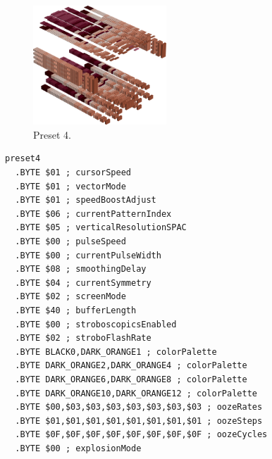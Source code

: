 \begin{minipage}[b]{0.48\linewidth}
\begin{figure}[H]                                                          
  \centering                                                             
  \begin{adjustbox}{width=5cm,center}                                   
  \includegraphics[width=5cm]{src/colorspace_presets/preset4-45.png}%
  \end{adjustbox}                                                        
\caption*{Preset 4.}                                           
\end{figure}                                                               
\end{minipage}
\hspace{0.1cm}
\begin{minipage}[b]{0.48\linewidth}                                       
\begin{lstlisting}[basicstyle=\ttfamily\tiny]
preset4
  .BYTE $01 ; cursorSpeed
  .BYTE $01 ; vectorMode
  .BYTE $01 ; speedBoostAdjust
  .BYTE $06 ; currentPatternIndex
  .BYTE $05 ; verticalResolutionSPAC
  .BYTE $00 ; pulseSpeed
  .BYTE $00 ; currentPulseWidth
  .BYTE $08 ; smoothingDelay
  .BYTE $04 ; currentSymmetry
  .BYTE $02 ; screenMode
  .BYTE $40 ; bufferLength
  .BYTE $00 ; stroboscopicsEnabled
  .BYTE $02 ; stroboFlashRate
  .BYTE BLACK0,DARK_ORANGE1 ; colorPalette
  .BYTE DARK_ORANGE2,DARK_ORANGE4 ; colorPalette
  .BYTE DARK_ORANGE6,DARK_ORANGE8 ; colorPalette
  .BYTE DARK_ORANGE10,DARK_ORANGE12 ; colorPalette
  .BYTE $00,$03,$03,$03,$03,$03,$03,$03 ; oozeRates
  .BYTE $01,$01,$01,$01,$01,$01,$01,$01 ; oozeSteps
  .BYTE $0F,$0F,$0F,$0F,$0F,$0F,$0F,$0F ; oozeCycles
  .BYTE $00 ; explosionMode
\end{lstlisting}
\end{minipage}

